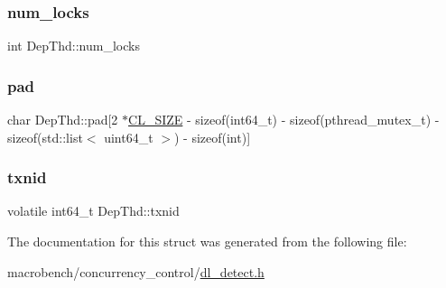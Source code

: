 \mbox{\label{structDepThd_a427fb898ef48f93641eb37851562b42c}} 
\subsubsection{\texorpdfstring{num\+\_\+locks}{num\_locks}}
{\footnotesize\ttfamily int Dep\+Thd\+::num\+\_\+locks}

\mbox{\label{structDepThd_a0008931a52118db5349c61aba36f279b}} 
\subsubsection{\texorpdfstring{pad}{pad}}
{\footnotesize\ttfamily char Dep\+Thd\+::pad\mbox{[}2 $\ast$\hyperlink{config_8h_aa18ff96566bf8c1f4cd38c1e7bc4ca80}{C\+L\+\_\+\+S\+I\+ZE} -\/ sizeof(int64\+\_\+t) -\/ sizeof(pthread\+\_\+mutex\+\_\+t) -\/ sizeof(std\+::list$<$ uint64\+\_\+t $>$) -\/ sizeof(int)\mbox{]}}

\mbox{\label{structDepThd_ae02ea3a099f2e51b2c65b5ff5ace9d27}} 
\subsubsection{\texorpdfstring{txnid}{txnid}}
{\footnotesize\ttfamily volatile int64\+\_\+t Dep\+Thd\+::txnid}



The documentation for this struct was generated from the following file\+:\begin{DoxyCompactItemize}
\item 
macrobench/concurrency\+\_\+control/\hyperlink{dl__detect_8h}{dl\+\_\+detect.\+h}\end{DoxyCompactItemize}

